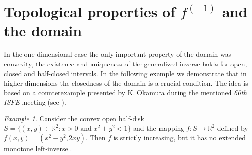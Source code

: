 \documentclass[12pt]{amsart}
\theoremstyle{remark}
\newtheorem{exmp}{Example}%
\theoremstyle{definition}
\newcommand{\RR}{\mathbb{R}}
\newcommand{\exmo}{extended monotone left-inverse }
\newcommand{\conv}{\mbox{\rm conv}}
\newcommand{\map}{\longrightarrow}
\begin{document}
\section{Topological properties of $ f^{(-1)} $ and the domain}

In the one-dimensional case the only important property 
of the domain was convexity, the existence and uniqueness 
of the generalized inverse holds for open, closed and 
half-closed intervals. In the following example we 
demonstrate that in higher dimensions the closedness 
of the domain is a crucial condition. The idea is 
based on a counterexample presented by 
K. Okamura during the mentioned {\em 60th ISFE} meeting 
(see \cite[5. Remark]{60ISFE}). 

\begin{exmp}\label{exmpl-Okamura}
Consider the convex open half-disk 
$ S = \lbrace (x,y) \in \RR^2 : x > 0 
\mbox{ and } x^2 + y^2 < 1 \rbrace $ 
and the mapping 
$ f : S \map \RR^2 $ defined by 
$ f(x,y) = \left( x^2 - y^2 , 2xy \right) $. 
Then $ f $ is strictly increasing, but 
it has no \exmo. 
\end{exmp}
\end{document}
